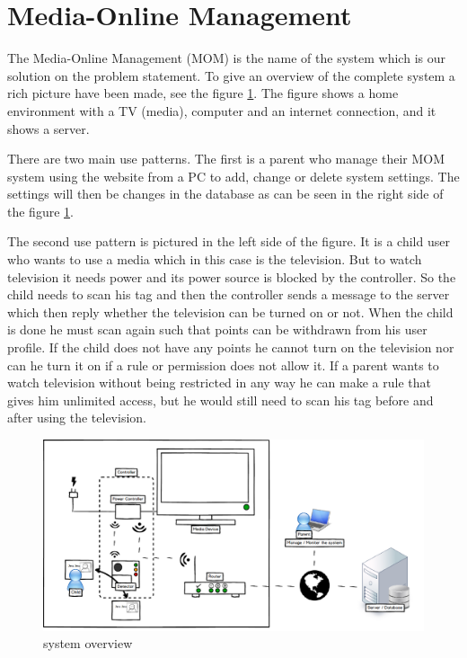 \section{Media-Online Management} %
The Media-Online Management (MOM) is the name of the system which is our solution on the problem statement. To give an overview of the complete system a rich picture \citep{OOAD} have been made, see the figure \ref{fig:systemoverview}. The figure shows a home environment with a TV (media), computer and an internet connection, and it shows a server. 

There are two main use patterns. The first is a parent who manage their MOM system using the website from a PC to add, change or delete system settings. The settings will then be changes in the database as can be seen in the right side of the figure \ref{fig:systemoverview}. 

The second use pattern is pictured in the left side of the figure. It is a child user who wants to use a media which in this case is the television. But to watch television it needs power and its power source is blocked by the controller. So the child needs to scan his tag and then the controller sends a message to the server which then reply whether the television can be turned on or not. When the child is done he must scan again such that points can be withdrawn from his user profile. If the child does not have any points he cannot turn on the television nor can he turn it on if a rule or permission does not allow it. If a parent wants to watch television without being restricted in any way he can make a rule that gives him unlimited access, but he would still need to scan his tag before and after using the television. %

\begin{figure}
	\centering
		\includegraphics[width=1.50\textwidth, angle= 90]{images/systemoverview2.png}
	\caption{system overview}
	\label{fig:systemoverview}
\end{figure}

